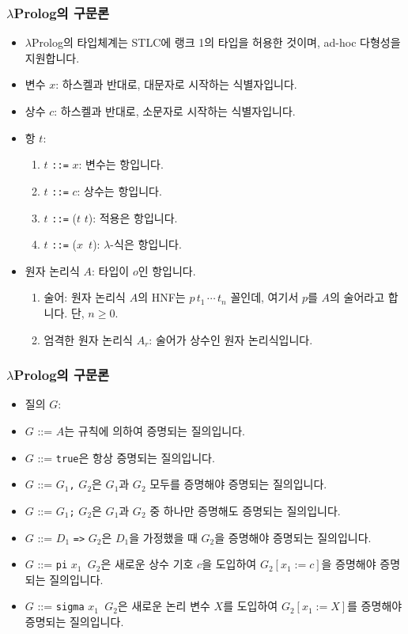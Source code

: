 \documentclass[slidestop,compress,mathserif]{beamer}
\begin{document}
    \begin{frame}
        \frametitle{$\lambda$Prolog의 구문론}
        \begin{itemize}
            \item $\lambda$Prolog의 타입체계는 STLC에 랭크 1의 타입을 허용한 것이며, ad-hoc 다형성을 지원합니다.
            \item 변수 $x$: 하스켈과 반대로, 대문자로 시작하는 식별자입니다.
            \item 상수 $c$: 하스켈과 반대로, 소문자로 시작하는 식별자입니다.
            \item 항 $t$:
            \begin{enumerate}
                \item $t$ \texttt{::=} $x$: 변수는 항입니다.
                \item $t$ \texttt{::=} $c$: 상수는 항입니다.
                \item $t$ \texttt{::=} ($t$ $t$): 적용은 항입니다.
                \item $t$ \texttt{::=} ($x$\texttt{\string\ }$t$): $\lambda$-식은 항입니다.
            \end{enumerate}
            \item 원자 논리식 $A$: 타입이 $o$인 항입니다.
            \begin{enumerate}
                \item 술어: 원자 논리식 $A$의 HNF는 $ p \, t_1 \, \cdots \, t_n $ 꼴인데, 여기서 $p$를 $A$의 술어라고 합니다. 단, $n \geq 0$.
                \item 엄격한 원자 논리식 $A_r$: 술어가 상수인 원자 논리식입니다.
            \end{enumerate}
        \end{itemize}
    \end{frame}

    \begin{frame}
        \frametitle{$\lambda$Prolog의 구문론}
        \begin{itemize}
            \item 질의 $G$:
            \item $G$ ::= $A$는 규칙에 의하여 증명되는 질의입니다.
            \item $G$ ::= \texttt{true}은 항상 증명되는 질의입니다.
            \item $G$ ::= $G_1$\texttt{,} $G_2$은 $G_1$과 $G_2$ 모두를 증명해야 증명되는 질의입니다.
            \item $G$ ::= $G_1$\texttt{;} $G_2$은 $G_1$과 $G_2$ 중 하나만 증명해도 증명되는 질의입니다.
            \item $G$ ::= $D_1$ \texttt{=>} $G_2$은 $D_1$을 가정했을 때 $G_2$을 증명해야 증명되는 질의입니다.
            \item $G$ ::= \texttt{pi} $x_1$\texttt{\string\ }$G_2$은 새로운 상수 기호 $c$을 도입하여 $G_2 \left[ x_1 := c \right]$을 증명해야 증명되는 질의입니다.
            \item $G$ ::= \texttt{sigma} $x_1$\texttt{\string\ }$G_2$은 새로운 논리 변수 $X$를 도입하여 $G_2 \left[ x_1 := X \right]$를 증명해야 증명되는 질의입니다.
        \end{itemize}
    \end{frame}
\end{document}
